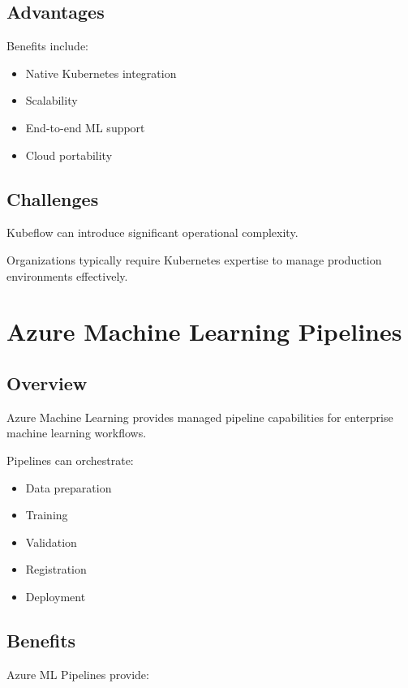 \subsection{Advantages}

Benefits include:

\begin{itemize}
    \item Native Kubernetes integration
    \item Scalability
    \item End-to-end ML support
    \item Cloud portability
\end{itemize}

\subsection{Challenges}

Kubeflow can introduce significant operational complexity.

Organizations typically require Kubernetes expertise to manage production environments effectively.

\section{Azure Machine Learning Pipelines}

\subsection{Overview}

Azure Machine Learning provides managed pipeline capabilities for enterprise machine learning workflows.

Pipelines can orchestrate:

\begin{itemize}
    \item Data preparation
    \item Training
    \item Validation
    \item Registration
    \item Deployment
\end{itemize}

\subsection{Benefits}

Azure ML Pipelines provide:

